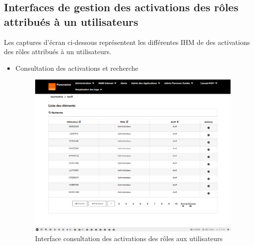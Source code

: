 \subsection{Interfaces de gestion des activations des rôles attribués à un utilisateurs}
Les captures d'écran ci-dessous représentent les différentes IHM de des activations des rôles attribués à un utilisateurs.
\newpage
\begin{itemize}
	\item Consultation des activations et recherche
	\begin{figure}[H]
		\centering
		\includegraphics[width=0.7\linewidth]{"img/screenshots/activation des roles/index"}
		\caption[Interface consultation des activations des rôles aux utilisateurs]{Interface consultation des activations des rôles aux utilisateurs}
		\label{fig:index-activation}
	\end{figure}
	

\end{itemize}
